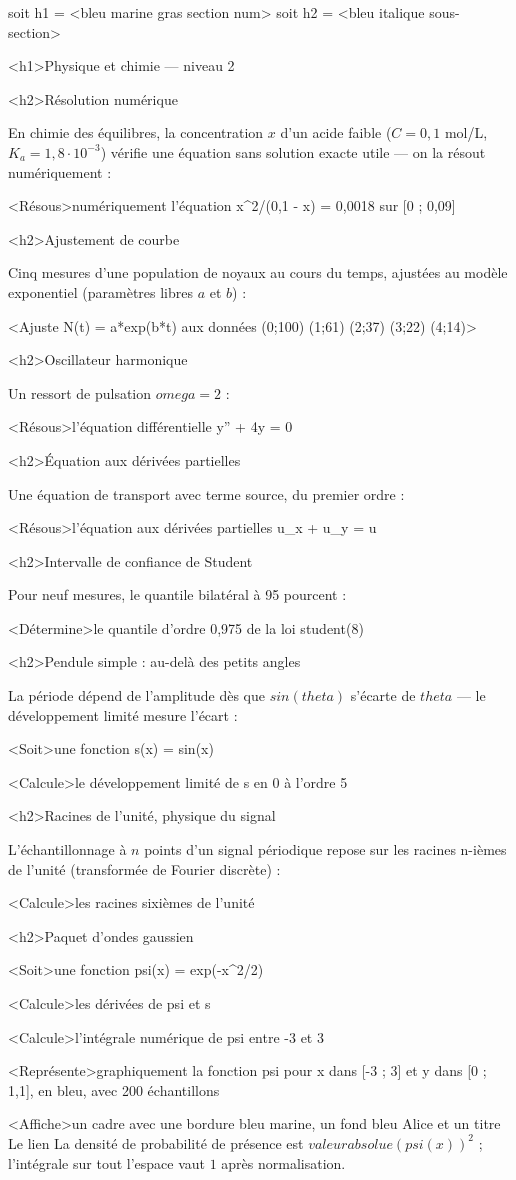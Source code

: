 \documentclass[marges=20, taille=11, precision=3]{texecole}
\begin{document}
soit h1 = <bleu marine gras section num>
soit h2 = <bleu italique sous-section>

<h1>Physique et chimie — niveau 2

<h2>Résolution numérique

En chimie des équilibres, la concentration $x$ d'un acide faible
($C = 0,1$ mol/L, $K_a = 1,8 \cdot 10^{-3}$) vérifie une équation sans solution exacte utile — on la résout numériquement :

<Résous>numériquement l'équation x^2/(0,1 - x) = 0,0018 sur [0 ; 0,09]

<h2>Ajustement de courbe

Cinq mesures d'une population de noyaux au cours du temps, ajustées au modèle exponentiel (paramètres libres $a$ et $b$) :

<Ajuste N(t) = a*exp(b*t) aux données {(0;100) (1;61) (2;37) (3;22) (4;14)}>

<h2>Oscillateur harmonique

Un ressort de pulsation $omega = 2$ :

<Résous>l'équation différentielle y'' + 4y = 0

<h2>Équation aux dérivées partielles

Une équation de transport avec terme source, du premier ordre :

<Résous>l'équation aux dérivées partielles u_x + u_y = u

<h2>Intervalle de confiance de Student

Pour neuf mesures, le quantile bilatéral à 95 pourcent :

<Détermine>le quantile d'ordre 0,975 de la loi student(8)

<h2>Pendule simple : au-delà des petits angles

La période dépend de l'amplitude dès que $sin(theta)$ s'écarte de
$theta$ — le développement limité mesure l'écart :

<Soit>une fonction s(x) = sin(x)

<Calcule>le développement limité de s en 0 à l'ordre 5

<h2>Racines de l'unité, physique du signal

L'échantillonnage à $n$ points d'un signal périodique repose sur les racines n-ièmes de l'unité (transformée de Fourier discrète) :

<Calcule>les racines sixièmes de l'unité

<h2>Paquet d'ondes gaussien

<Soit>une fonction psi(x) = exp(-x^2/2)

<Calcule>les dérivées de psi et s

<Calcule>l'intégrale numérique de psi entre -3 et 3

<Représente>graphiquement la fonction psi pour x dans [-3 ; 3] et y dans [0 ; 1,1], en bleu, avec 200 échantillons

<Affiche>un cadre avec une bordure bleu marine, un fond bleu Alice et un titre {Le lien} {
	La densité de probabilité de présence est $valeur absolue(psi(x))^2$ ;
	l'intégrale sur tout l'espace vaut $1$ après normalisation.
}
\end{document}

